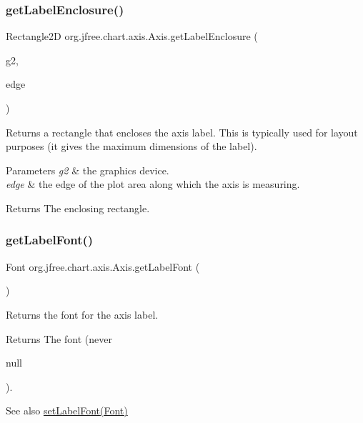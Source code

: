 \subsubsection{\texorpdfstring{get\+Label\+Enclosure()}{getLabelEnclosure()}}
{\footnotesize\ttfamily Rectangle2D org.\+jfree.\+chart.\+axis.\+Axis.\+get\+Label\+Enclosure (\begin{DoxyParamCaption}\item[{Graphics2D}]{g2,  }\item[{Rectangle\+Edge}]{edge }\end{DoxyParamCaption})\hspace{0.3cm}{\ttfamily [protected]}}

Returns a rectangle that encloses the axis label. This is typically used for layout purposes (it gives the maximum dimensions of the label).


\begin{DoxyParams}{Parameters}
{\em g2} & the graphics device. \\
\hline
{\em edge} & the edge of the plot area along which the axis is measuring.\\
\hline
\end{DoxyParams}
\begin{DoxyReturn}{Returns}
The enclosing rectangle. 
\end{DoxyReturn}
\mbox{\label{classorg_1_1jfree_1_1chart_1_1axis_1_1_axis_a8aa271547c74cba1a28e26068828ef0e}} 
\subsubsection{\texorpdfstring{get\+Label\+Font()}{getLabelFont()}}
{\footnotesize\ttfamily Font org.\+jfree.\+chart.\+axis.\+Axis.\+get\+Label\+Font (\begin{DoxyParamCaption}{ }\end{DoxyParamCaption})}

Returns the font for the axis label.

\begin{DoxyReturn}{Returns}
The font (never
\begin{DoxyCode}
null 
\end{DoxyCode}
 ).
\end{DoxyReturn}
\begin{DoxySeeAlso}{See also}
\mbox{\hyperlink{classorg_1_1jfree_1_1chart_1_1axis_1_1_axis_a9fe56f9cd8d81dc5a0b96b70ab0c8643}{set\+Label\+Font(\+Font)}} 
\end{DoxySeeAlso}
\mbox{\label{classorg_1_1jfree_1_1chart_1_1axis_1_1_axis_a8b74d954f3fe5c0cd36ce38399cccd98}} 
